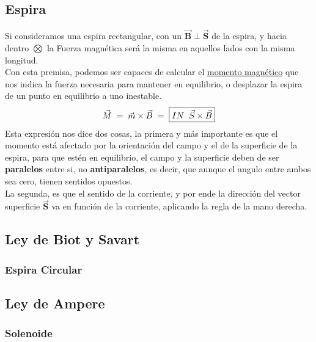 \subsection{Espira}
\noindent Si consideramos una espira rectangular, con un \(\bm{\vec{B}\perp\vec{S}}\) de la espira, y hacia dentro \(\bm{\bigotimes}\) la Fuerza magnética será la misma en aquellos lados con la misma longitud.
\\
Con esta premisa, podemos ser capaces de calcular el \underline{momento magnético} que nos indica la fuerza necesaria para mantener en equilibrio, o desplazar la espira de un punto en equilibrio a uno inestable.
\[
        \vec{M} \hspace{1mm} = \hspace{1mm} \vec{m}\times\vec{B} \hspace{1mm} = \hspace{1mm} \boxed{IN \hspace{2mm} \vec{S} \times \vec{B}}
\]
Esta expresión nos dice dos cosas, la primera y más importante es que el momento está afectado por la orientación del campo y el de la superficie de la espira, para que estén en equilibrio, el campo y la superficie deben de ser \textbf{paralelos} entre si, no \textbf{antiparalelos}, es decir, que aunque el angulo entre ambos sea cero, tienen sentidos opuestos.
\\
La segunda, es que el sentido de la corriente, y por ende la dirección del vector superficie \(\bm{\vec{S}}\) va en función de la corriente, aplicando la regla de la mano derecha. %
\subsection{Ley de Biot y Savart}
\subsubsection{Espira Circular}
\subsection{Ley de Ampere}
\subsubsection{Solenoide}